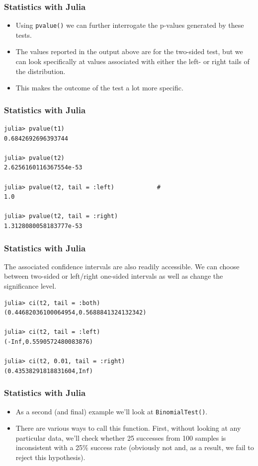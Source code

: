 \documentclass[Master.tex]{subfiles}
\begin{document}
\begin{frame}[fragile]
	\frametitle{Statistics with Julia}
	\large
\begin{itemize}
	\item Using \texttt{pvalue()} we can further interrogate the p-values generated by these tests. 
	\item The values reported in the output above are for the two-sided test, but we can look specifically at values associated with either the left- or right tails of the distribution.
	\item This makes the outcome of the test a lot more specific.
\end{itemize}

\end{frame}
\begin{frame}[fragile]
	\frametitle{Statistics with Julia}
	\large
	\begin{verbatim}
julia> pvalue(t1)
0.6842692696393744

julia> pvalue(t2)
2.6256160116367554e-53

julia> pvalue(t2, tail = :left)            #
1.0

julia> pvalue(t2, tail = :right)          
1.3128080058183777e-53
\end{verbatim}
\end{frame}
\begin{frame}[fragile]
	\frametitle{Statistics with Julia}
	\large
The associated confidence intervals are also readily accessible. We can choose between two-sided or left/right one-sided intervals as well as change the significance level.

\begin{verbatim}
julia> ci(t2, tail = :both)               
(0.44682036100064954,0.5688841324132342)

julia> ci(t2, tail = :left)                
(-Inf,0.5590572480083876)

julia> ci(t2, 0.01, tail = :right)         
(0.43538291818831604,Inf)
\end{verbatim}
\end{frame}
\begin{frame}
\frametitle{Statistics with Julia}
\large
\begin{itemize}
	\item As a second (and final) example we’ll look at \texttt{BinomialTest()}. 
	\item There are various ways to call this function. First, without looking at any particular data, we’ll check whether 25 successes from 100 samples is inconsistent with a 25\% success rate (obviously not and, as a result, we fail to reject this hypothesis).
\end{itemize}

\end{frame}
\end{document}
